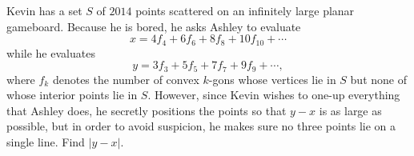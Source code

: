 Kevin has a set $S$ of $2014$ points scattered on an infinitely large planar gameboard. Because he is bored, he asks Ashley to evaluate
\[ x = 4f_4 + 6f_6 + 8f_8 + 10f_{10} + \cdots \]
while he evaluates
\[ y = 3f_3 + 5f_5+7f_7+9f_9 + \cdots, \]
where $f_k$ denotes the number of convex $k$-gons whose vertices lie in $S$ but none of whose interior points lie in $S$.
However, since Kevin wishes to one-up everything that Ashley does,
he secretly positions the points so that $y-x$ is as large as possible,
but in order to avoid suspicion, he makes sure no three points lie on a single line.
Find $\left\lvert y-x \right\rvert$.
